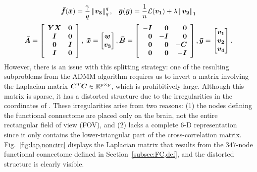 \begin{equation}
	\begin{array}{c}
		\fbar(\xbar)=\dstyle\frac{\gamma}{q}\norm{\vc}^q_q , \;\;\;
		\gbar(\ybar)=\dstyle\frac{1}{n}\Loss(\va) + \lambda\norm{\vb}_1  
		\vspace{0.02\linewidth} \\
		\Abar = 	\ba{cc} 	\Y\X	& \bzero \\ \I	& \bzero \\ \bzero 	& \I \\ \I & \bzero \ea 	, \;
		\xbar = \bmat \w \\ \vc \emat, 
		\Bbar = 	\ba{rrr} 	-\I 	& \bzero	& \bzero \\ \bzero & -\I & \bzero  \\ 
						 \bzero & \bzero & -\C \\ \bzero & \bzero & -\I \ea,
		\ybar = \bmat \va \\ \vb \\ \vd \emat 	.
	\end{array}
	\label{eqn:admm,objective1}
\end{equation}
However, there is an issue with this splitting strategy: one of the resulting subproblems from the ADMM algorithm requires us to invert a matrix involving the Laplacian matrix ${\bm{C}}^T{\bm{C}}\in\mathbb{R}^{p\times p}$, which is prohibitively large.
Although this matrix is sparse, it has a distorted structure due to the irregularities in the coordinates of \x.
These irregularities arise from two reasons:
(1) the nodes defining the functional connectome \x are placed only on the brain, not the entire rectangular field of view (FOV), and
(2) \x lacks a complete $6$-D representation since it only contains the lower-triangular part of the cross-correlation matrix.
Fig.~\ref{fig:lap,noncirc} displays the Laplacian matrix that results from the $347$-node functional connectome defined in Section~\ref{subsec:FC,def}, and the distorted structure is clearly visible.

